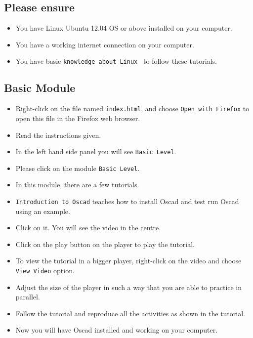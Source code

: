 \subsection{Please ensure}
  \begin{itemize}
  \item You have Linux Ubuntu 12.04 OS or above installed on your computer.
\item You have a working internet connection on your computer.
 \item You have basic {\tt knowledge about Linux } to follow these tutorials.
 \end{itemize}


  \subsection{Basic Module}
  \begin{itemize}
  \item Right-click on the file named {\tt index.html}, and choose {\tt Open with Firefox} to open this file in the Firefox web browser.
  \item Read the instructions given.
  \item In the left hand side panel you will see {\tt Basic Level}.
  \item Please click on the module {\tt Basic Level}.
\item In this module, there are a few tutorials.
\item {\tt Introduction to Oscad} teaches how to install Oscad and test run Oscad using an example. 
\item Click on it. You will see the video in the centre.
  \item Click on the play button on the player to play the tutorial.
  \item To view the tutorial in a bigger player, right-click on the video and choose {\tt View Video} option. 
  \item Adjust the size of the player in such a way that you are able to practice in parallel.
\item Follow the tutorial and reproduce all the activities as shown in the tutorial.
\item Now you will have Oscad installed and working on your computer.
  \end{itemize}
  
  
  
